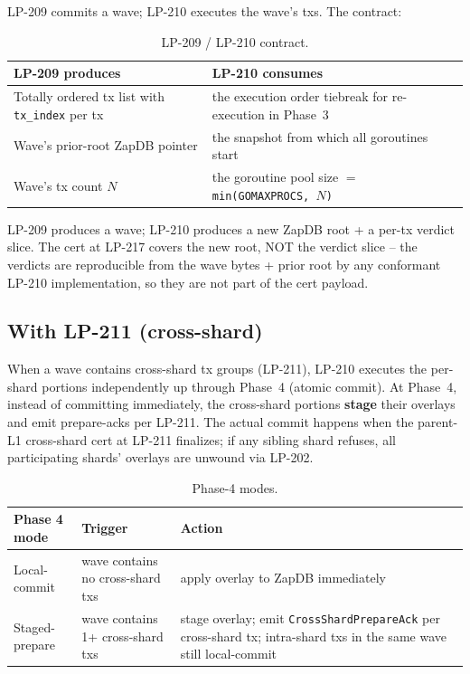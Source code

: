 LP-209 commits a wave; LP-210 executes the wave's txs. The contract:

\begin{table}[h]
\centering
\small
\begin{tabular}{@{}p{6.5cm}p{6.5cm}@{}}
\toprule
\textbf{LP-209 produces} & \textbf{LP-210 consumes} \\
\midrule
Totally ordered tx list with \texttt{tx\_index} per tx & the execution order tiebreak for re-execution in Phase~3 \\
Wave's prior-root ZapDB pointer & the snapshot from which all goroutines start \\
Wave's tx count $N$ & the goroutine pool size $=$ \texttt{min(GOMAXPROCS, $N$)} \\
\bottomrule
\end{tabular}
\caption{LP-209 / LP-210 contract.}
\label{tab:lp209-210}
\end{table}

LP-209 produces a wave; LP-210 produces a new ZapDB root + a per-tx
verdict slice. The cert at LP-217 covers the new root, NOT the
verdict slice -- the verdicts are reproducible from the wave bytes +
prior root by any conformant LP-210 implementation, so they are not
part of the cert payload.

\subsection{With LP-211 (cross-shard)}

When a wave contains cross-shard tx groups (LP-211), LP-210 executes
the per-shard portions independently up through Phase~4 (atomic
commit). At Phase~4, instead of committing immediately, the
cross-shard portions \textbf{stage} their overlays and emit
prepare-acks per LP-211. The actual commit happens when the
parent-L1 cross-shard cert at LP-211 finalizes; if any sibling shard
refuses, all participating shards' overlays are unwound via LP-202.

\begin{table}[h]
\centering
\small
\begin{tabular}{@{}p{2.5cm}p{4cm}p{5cm}@{}}
\toprule
\textbf{Phase 4 mode} & \textbf{Trigger} & \textbf{Action} \\
\midrule
Local-commit & wave contains no cross-shard txs & apply overlay to ZapDB immediately \\
Staged-prepare & wave contains 1+ cross-shard txs & stage overlay; emit \texttt{CrossShardPrepareAck} per cross-shard tx; intra-shard txs in the same wave still local-commit \\
\bottomrule
\end{tabular}
\caption{Phase-4 modes.}
\label{tab:phase4}
\end{table}

